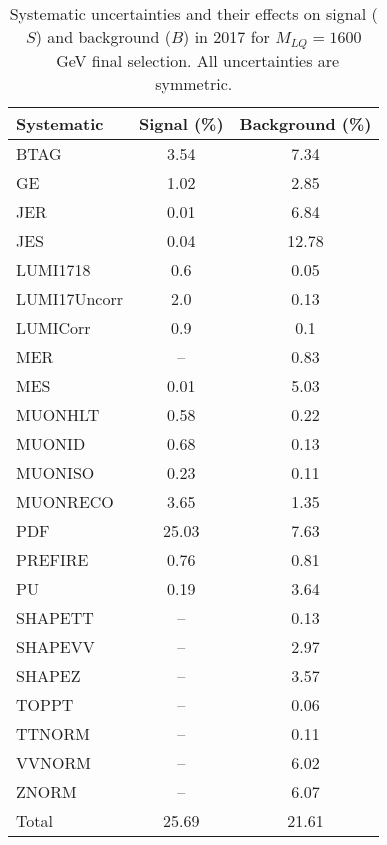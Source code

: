\begin{table}[htbp]
\begin{center}
\caption{Systematic uncertainties and their effects on signal ($S$) and background ($B$) in 2017 for $M_{LQ}=1600$~GeV final selection. All uncertainties are symmetric.}
\begin{tabular}{lcc}
\hline\hline
Systematic & Signal (\%) & Background (\%) \\ \hline 
BTAG & 3.54 & 7.34\\ 
GE & 1.02 & 2.85\\ 
JER & 0.01 & 6.84\\ 
JES & 0.04 & 12.78\\ 
LUMI1718 & 0.6 & 0.05\\ 
LUMI17Uncorr & 2.0 & 0.13\\ 
LUMICorr & 0.9 & 0.1\\ 
MER & -- & 0.83\\ 
MES & 0.01 & 5.03\\ 
MUONHLT & 0.58 & 0.22\\ 
MUONID & 0.68 & 0.13\\ 
MUONISO & 0.23 & 0.11\\ 
MUONRECO & 3.65 & 1.35\\ 
PDF & 25.03 & 7.63\\ 
PREFIRE & 0.76 & 0.81\\ 
PU & 0.19 & 3.64\\ 
SHAPETT & -- & 0.13\\ 
SHAPEVV & -- & 2.97\\ 
SHAPEZ & -- & 3.57\\ 
TOPPT & -- & 0.06\\ 
TTNORM & -- & 0.11\\ 
VVNORM & -- & 6.02\\ 
ZNORM & -- & 6.07\\ 
Total & 25.69 & 21.61\\ \hline \hline
\end{tabular}
\label{tab:SysUncertainties_uujj_1600}
\end{center}
\end{table}

